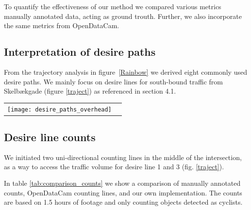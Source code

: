 To quantify the effectiveness of our method we compared various metrics manually annotated data, acting as ground trouth. 
Further, we also incorporate the same metrics from OpenDataCam.

\subsection{Interpretation of desire paths}
From the trajectory analysis in figure~\ref{Rainbow} we derived eight commonly used desire paths.
We mainly focus on desire lines for south-bound traffic from Skelbækgade (figure \ref{traject}) as referenced in section 4.1.
\ \\

\raggedbottom
\begin{tabular}{@{}cc}
\texttt{[image: desire\_paths\_overhead]} 
\end{tabular}
\label{traject}

\subsection{Desire line counts}
We initiated two uni-directional counting lines in the middle of the intersection, 
as a way to access the traffic volume for desire line 1 and 3 (fig. \ref{traject}).

In table \ref{tab:comparison_counts} we show a comparison of manually annotated counts, OpenDataCam counting lines, 
and our own implementation. The counts are based on 1.5 hours of footage and only counting objects detected as cyclists.

\begin{table}[h]
\caption{Comparison of counts}
\label{tab:comparison_counts}
\end{table}

